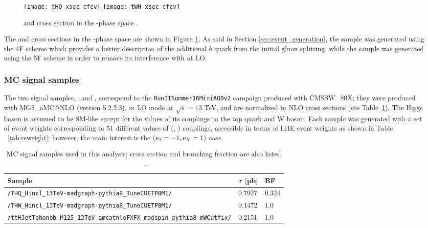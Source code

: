 \begin{figure}[htp]
\centering
\texttt{[image: tHQ\_xsec\_cfcv]}
\texttt{[image: tWH\_xsec\_cfcv]} 
\caption[\tHq and \tHW cross section in the \Ct-\CV phase space]{\tHq and \tHW cross section in the \Ct-\CV phase space \cite{THQProdTwiki}.}
\label{fig:ktkv_phase_space}
\end{figure}

The \tHq and \tHW cross sections in the \Ct-\CV phase space are shown in Figure \ref{fig:ktkv_phase_space}. As said in Section \ref{sec:event_generation}, the \tHq sample was generated using the 4F scheme which provides a better description of the additional $b$ quark from the initial gluon splitting, while the \tHW sample was generated using the 5F scheme in order to remove its interference with \ttH at LO.


\subsubsection*{MC signal samples}\label{ssec:mc_signal}

The two signal samples, \tHq\ and \tHW, correspond to the \verb|RunIISummer16MiniAODv2| campaign produced with CMSSW\_80X; they were produced with \textsc{MG5\_}a\textsc{MC@NLO} (version 5.2.2.3), in LO mode at $\sqrt{s}=13$ TeV, and are normalized to NLO cross sections (see Table~\ref{tab:sigsamples}). The Higgs boson is assumed to be SM-like except for the values of its couplings to the top quark and W boson. Each sample was generated with a set of event weights corresponding to 51 different values of (\Ct, \CV) couplings, accessible in terms of LHE event weights as shown in Table ~\ref{tab:reweight}; however, the main interest is the $(\kappa_t=-1,\kappa_\text{V}=1)$ case. 

\begin{table}[h]
\centering \small
\begin{tabular}{lll}
Sample & $\sigma$ [pb] & BF \\ \hline
\verb|/THQ_Hincl_13TeV-madgraph-pythia8_TuneCUETP8M1/|                  & 0.7927 & 0.324 \\
\verb|/THW_Hincl_13TeV-madgraph-pythia8_TuneCUETP8M1/|                  & 0.1472 & 1.0   \\\hline
\verb|/ttHJetToNonbb_M125_13TeV_amcatnloFXFX_madspin_pythia8_mWCutfix/|   & 0.2151 & 1.0 \\\hline
\end{tabular}
\caption[MC signal samples.]{MC signal samples used in this analysis; cross section and branching fraction are also listed ~\cite{THQProdTwiki}.}\label{tab:sigsamples}
\end{table}

